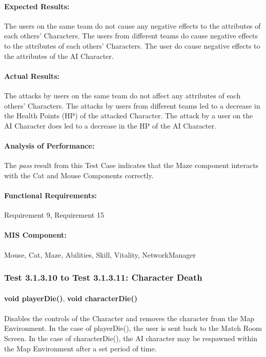 \documentclass{article}
\begin{document}
    \paragraph{Expected Results:} The users on the same team do not cause any negative effects to the attributes of each others' Characters. The users from different teams do cause negative effects to the attributes of each others' Characters. The user do cause negative effects to the attributes of the AI Character.
    \paragraph{Actual Results:} The attacks by users on the same team do not affect any attributes of each others' Characters. The attacks by users from different teams led to a decrease in the Health Points (HP) of the attacked Character. The attack by a user on the AI Character does led to a decrease in the HP of the AI Character.
    \paragraph{Analysis of Performance:} The \emph{pass} result from this Test Case indicates that the Maze component interacts with the Cat and Mouse Components correctly.
    \paragraph{Functional Requirements:} Requirement 9, Requirement 15
    \paragraph{MIS Component:} Mouse, Cat, Maze, Abilities, Skill, Vitality, NetworkManager
    
    \subsubsection{Test 3.1.3.10 to Test 3.1.3.11: Character Death}
    \paragraph{}\textbf{void playerDie()}, \textbf{void characterDie()}
    \paragraph{} Disables the controls of the Character and removes the character from the Map Environment. In the case of playerDie(), the user is sent back to the Match Room Screen. In the case of characterDie(), the AI character may be respawned within the Map Environment after a set period of time.
\end{document}
